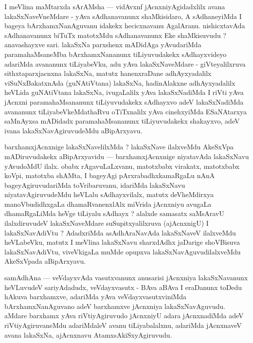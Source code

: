 \begin{artha}
I meVlina maMtarxda sArAMsha --- vidAvxnf jAcnxniyAgidadxlilx avana lakaSxNaveVneMdare - yAva sAdhanavanunx shaMkisidaro, A sAdhaneyiMda I bageya bArxhamxNanAguvanu idakekx hecicxnavanu AgalAranu. nishicxtavAda sAdhanavanunx biTuTx matotxMdu sAdhanavanunx Eke shaMkisuvudu ? anavashayxve sari. lakaSxNa parxshenx mADidAga yAvudariMda paramahaMsaneMba bArxhamxNananunx tiLiyuvudakekx sAdhayxvideyo adariMda avananunx tiLiyabeVku, adu yAva lakaSxNaveMdare - giVteyalilxruva sithxtaparxjacnxna lakaSxNa, matutx hanenxraDane adhAyxyadalilx viSuNxBakatxnAda (guNAtiVtana) lakaSxNa, hadinAlakxne adhAyxyadalilx heVLida guNAtiVtana lakaSxNa, ivugaLalilx yAva lakaSxNadiMda I riVti yAva jAcnxni paramahaMsananunx tiLiyuvudakekx sAdhayxvo adeV lakaSxNadiMda avananunx tiLiyabeVkeMdathaRvu oTiTxnalilx yAva cinehxyiMda ESaNAtarxya saMnAyxsa mADidadx paramahaMsananunx tiLiyuvudakekx shakayxvo, adeV ivana lakaSxNavAgiruvudeMdu aBipArxyavu.
\end{artha}

\begin{artha}
barxhamxjAcnxnige lakaSxNavelilxMda ? lakaSxNave ilalxveMdu AkeSxVpa mADiruvudakekx aBipArxyavidu --- barxhamxjAcnxnige niyatavAda lakaSxNavu yAvudoMdU ilalx. obabx rAgavuLaLxvanu, matotxbabx virakatx, matotxbabx koVpi, matotxba shAMta, I bageyAgi pArxrabadhxkamaRgaLu nAnA bageyAgiruvudariMda toVribaruvanu, idariMda lakaSxNavu niyatavAgiruvudeMdu heVLalu sAdhayxvilalx, matutx deVheMdirxya manoVbudidhxgaLa dhamaRvanenxlAlx miVrida jAcnxniyu avugaLa dhamaRgaLiMda heVge tiLiyalu sAdhayx ? alalxde samasatx saMsAravU ilalxdiruvudeV lakaSxNaveMdare suSupitxyalilxruva (ajAcnxnigU) I lakaSxNavAdiVtu ? AdadxriMda asAdhAraNavAda lakaSxNaveV ilalxveMdu heVLabeVku, matutx I meVlina lakaSxNavu sharxdAdhx jaDarige shoVBisuva lakaSxNavAdiVtu, viveVkigaLa muMde opupxva lakaSxNavAguvudilalxveMdu AkeSxVpada aBipArxyavu.
\end{artha}

\begin{artha}
samAdhAna --- veVdayxvAda vasutxvanunx anusarisi jAcnxniya lakaSxNavanunx heVLuvudeV sariyAdadudx, veVdayxvasutx - BAva aBAva I eraDanunx toDedu hAkuva barxhamxve, adariMda yAva veVdayxvasutxviniMda bArxhamxNanAguvano adeV barxhamxve jAcnxniya lakaSxNavAguvudu. aMdare barxhamx yAva riVtiyAgiruvudo jAcnxniyU adara jAcnxnadiMda adeV riVtiyAgiruvaneMdu adariMdaleV avanu tiLiyabalalxnu, adariMda jAcnxnaveV avana lakaSxNa, ajAcnxnavu AtamxsAkiSxyAgiruvudu.
\end{artha}

